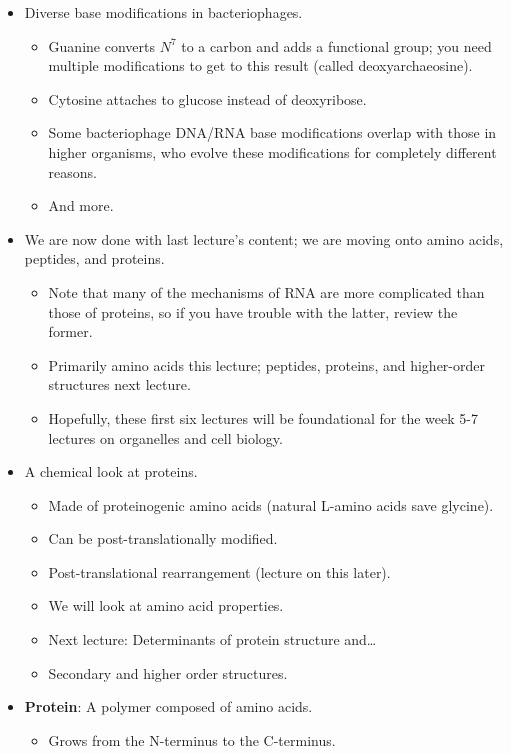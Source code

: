 \documentclass[../notes.tex]{subfiles}
\begin{document}
\begin{itemize}
    \item Diverse base modifications in bacteriophages.
    \begin{itemize}
        \item Guanine converts $N^7$ to a carbon and adds a functional group; you need multiple modifications to get to this result (called deoxyarchaeosine).
        \item Cytosine attaches to glucose instead of deoxyribose.
        \item Some bacteriophage DNA/RNA base modifications overlap with those in higher organisms, who evolve these modifications for completely different reasons.
        \item And more.
    \end{itemize}
    \item We are now done with last lecture's content; we are moving onto amino acids, peptides, and proteins.
    \begin{itemize}
        \item Note that many of the mechanisms of RNA are more complicated than those of proteins, so if you have trouble with the latter, review the former.
        \item Primarily amino acids this lecture; peptides, proteins, and higher-order structures next lecture.
        \item Hopefully, these first six lectures will be foundational for the week 5-7 lectures on organelles and cell biology.
    \end{itemize}
    \item A chemical look at proteins.
    \begin{itemize}
        \item Made of proteinogenic amino acids (natural L-amino acids save glycine).
        \item Can be post-translationally modified.
        \item Post-translational rearrangement (lecture on this later).
        \item We will look at amino acid properties.
        \item Next lecture: Determinants of protein structure and\dots
        \item Secondary and higher order structures.
    \end{itemize}
    \item \textbf{Protein}: A polymer composed of amino acids.
    \begin{itemize}
        \item Grows from the N-terminus to the C-terminus.

\end{itemize}
\end{itemize}
\end{document}
